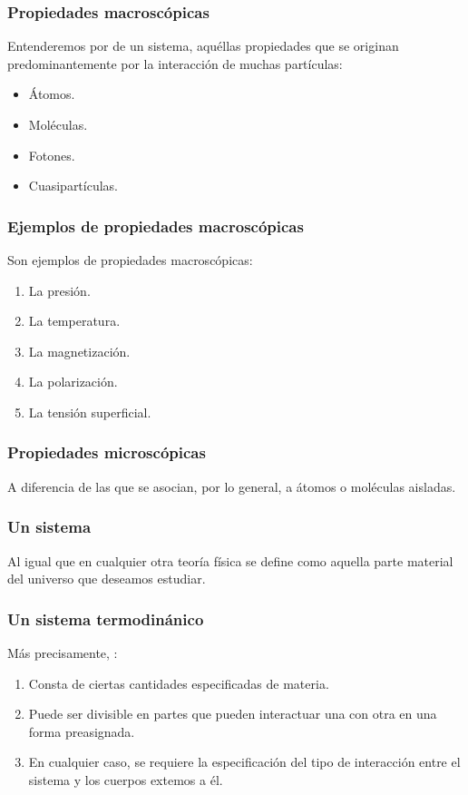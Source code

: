 \documentclass[12pt]{beamer}
\begin{document}
\begin{frame}
\frametitle{Propiedades macroscópicas}
Entenderemos por  de un sistema, aquéllas propiedades que se originan predominantemente por la interacción de muchas partículas:
\pause
\begin{itemize}[<+->]
\item Átomos.
\item Moléculas.
\item Fotones.
\item Cuasipartículas.
\end{itemize}
\end{frame}
\begin{frame}
\frametitle{Ejemplos de propiedades macroscópicas}
Son ejemplos de propiedades macroscópicas:
\pause
{}
\begin{enumerate}[<+->]
\item La presión.
\item La temperatura.
\item La magnetización.
\item La polarización.
\item La tensión superficial.
\end{enumerate}
\end{frame}
\begin{frame}
\frametitle{Propiedades microscópicas}
A diferencia de las  que se asocian, por lo general, a átomos o moléculas aisladas.
\end{frame}
\begin{frame}
\frametitle{Un sistema}
Al igual que en cualquier otra teoría física se define  como aquella parte material del universo que deseamos estudiar.
\end{frame}
\begin{frame}
\frametitle{Un sistema termodinánico}    
Más precisamente, :
\pause
{}
\begin{enumerate}[<+->]
\item Consta de ciertas cantidades especificadas de materia.
\item Puede ser divisible en partes que pueden interactuar una con otra en una forma preasignada.
\item En cualquier caso, \pause se requiere la especificación del tipo de interacción entre el sistema
y los cuerpos extemos a él.
\end{enumerate}
\end{frame}
\end{document}
